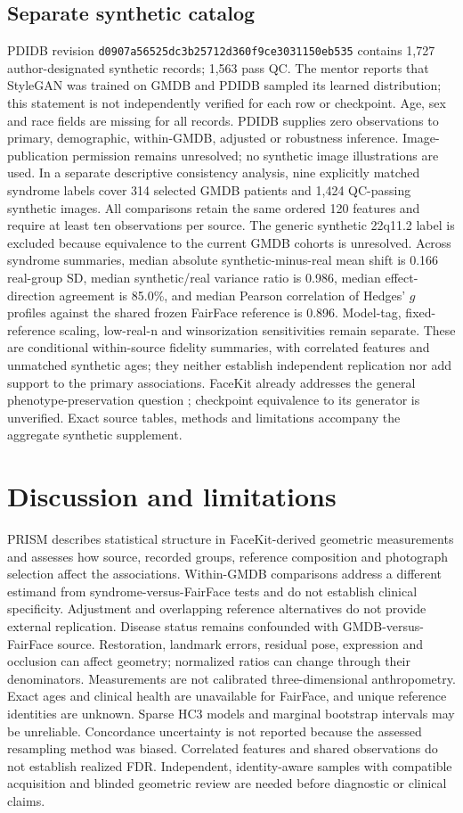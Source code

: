 \documentclass[11pt]{article}
\begin{document}
\subsection{Separate synthetic catalog}
PDIDB revision \texttt{d0907a56525dc3b25712d360f9ce3031150eb535} contains 1,727 author-designated synthetic records; 1,563 pass QC. The mentor reports that StyleGAN was trained on GMDB and PDIDB sampled its learned distribution; this statement is not independently verified for each row or checkpoint. Age, sex and race fields are missing for all records. PDIDB supplies zero observations to primary, demographic, within-GMDB, adjusted or robustness inference. Image-publication permission remains unresolved; no synthetic image illustrations are used.
In a separate descriptive consistency analysis, nine explicitly matched syndrome labels cover 314 selected GMDB patients and 1,424 QC-passing synthetic images. All comparisons retain the same ordered 120 features and require at least ten observations per source. The generic synthetic 22q11.2 label is excluded because equivalence to the current GMDB cohorts is unresolved. Across syndrome summaries, median absolute synthetic-minus-real mean shift is 0.166 real-group SD, median synthetic/real variance ratio is 0.986, median effect-direction agreement is 85.0\%, and median Pearson correlation of Hedges' $g$ profiles against the shared frozen FairFace reference is 0.896. Model-tag, fixed-reference scaling, low-real-n and winsorization sensitivities remain separate. These are conditional within-source fidelity summaries, with correlated features and unmatched synthetic ages; they neither establish independent replication nor add support to the primary associations. FaceKit already addresses the general phenotype-preservation question \cite{facekit2026}; checkpoint equivalence to its generator is unverified. Exact source tables, methods and limitations accompany the aggregate synthetic supplement.
\section{Discussion and limitations}
PRISM describes statistical structure in FaceKit-derived geometric measurements and assesses how source, recorded groups, reference composition and photograph selection affect the associations. Within-GMDB comparisons address a different estimand from syndrome-versus-FairFace tests and do not establish clinical specificity. Adjustment and overlapping reference alternatives do not provide external replication.
Disease status remains confounded with GMDB-versus-FairFace source. Restoration, landmark errors, residual pose, expression and occlusion can affect geometry; normalized ratios can change through their denominators. Measurements are not calibrated three-dimensional anthropometry. Exact ages and clinical health are unavailable for FairFace, and unique reference identities are unknown. Sparse HC3 models and marginal bootstrap intervals may be unreliable. Concordance uncertainty is not reported because the assessed resampling method was biased. Correlated features and shared observations do not establish realized FDR. Independent, identity-aware samples with compatible acquisition and blinded geometric review are needed before diagnostic or clinical claims.
\end{document}

